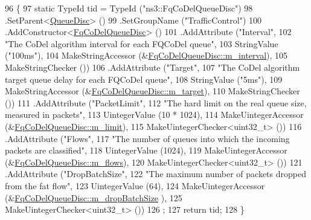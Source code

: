 \begin{DoxyCode}
96 \{
97   \textcolor{keyword}{static} TypeId tid = TypeId (\textcolor{stringliteral}{"ns3::FqCoDelQueueDisc"})
98     .SetParent<\hyperlink{classns3_1_1QueueDisc_a0e328ad3196b7d16783b8680722381d6}{QueueDisc}> ()
99     .SetGroupName (\textcolor{stringliteral}{"TrafficControl"})
100     .AddConstructor<\hyperlink{classns3_1_1FqCoDelQueueDisc_a72dcda2a80098ffb4950d219e759a650}{FqCoDelQueueDisc}> ()
101     .AddAttribute (\textcolor{stringliteral}{"Interval"},
102                    \textcolor{stringliteral}{"The CoDel algorithm interval for each FQCoDel queue"},
103                    StringValue (\textcolor{stringliteral}{"100ms"}),
104                    MakeStringAccessor (&\hyperlink{classns3_1_1FqCoDelQueueDisc_a4662972dcde7a505bc19b23ebe842de5}{FqCoDelQueueDisc::m\_interval}),
105                    MakeStringChecker ())
106     .AddAttribute (\textcolor{stringliteral}{"Target"},
107                    \textcolor{stringliteral}{"The CoDel algorithm target queue delay for each FQCoDel queue"},
108                    StringValue (\textcolor{stringliteral}{"5ms"}),
109                    MakeStringAccessor (&\hyperlink{classns3_1_1FqCoDelQueueDisc_a6bc9b101ee9aa76c0ace0d3ccd6bb3c4}{FqCoDelQueueDisc::m\_target}),
110                    MakeStringChecker ())
111     .AddAttribute (\textcolor{stringliteral}{"PacketLimit"},
112                    \textcolor{stringliteral}{"The hard limit on the real queue size, measured in packets"},
113                    UintegerValue (10 * 1024),
114                    MakeUintegerAccessor (&\hyperlink{classns3_1_1FqCoDelQueueDisc_a7730a22f6e323d171f58aad51d97659c}{FqCoDelQueueDisc::m\_limit}),
115                    MakeUintegerChecker<uint32\_t> ())
116     .AddAttribute (\textcolor{stringliteral}{"Flows"},
117                    \textcolor{stringliteral}{"The number of queues into which the incoming packets are classified"},
118                    UintegerValue (1024),
119                    MakeUintegerAccessor (&\hyperlink{classns3_1_1FqCoDelQueueDisc_afdd4c8c212430bea70aefde0df14df43}{FqCoDelQueueDisc::m\_flows}),
120                    MakeUintegerChecker<uint32\_t> ())
121     .AddAttribute (\textcolor{stringliteral}{"DropBatchSize"},
122                    \textcolor{stringliteral}{"The maximum number of packets dropped from the fat flow"},
123                    UintegerValue (64),
124                    MakeUintegerAccessor (&\hyperlink{classns3_1_1FqCoDelQueueDisc_a55b30ed7f12ccd45ced132f08543ddd3}{FqCoDelQueueDisc::m\_dropBatchSize}
      ),
125                    MakeUintegerChecker<uint32\_t> ())
126   ;
127   \textcolor{keywordflow}{return} tid;
128 \}
\end{DoxyCode}


